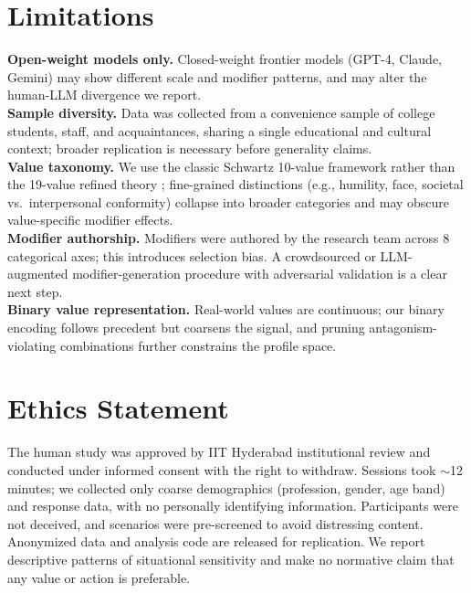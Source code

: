 \documentclass[11pt]{article}
\begin{document}
\section*{Limitations}
\label{sec:limitations}
\textbf{Open-weight models only.} Closed-weight frontier models (GPT-4, Claude, Gemini) may show different scale and modifier patterns, and may alter the human-LLM divergence we report.\\[2pt]
\textbf{Sample diversity.} Data was collected from a convenience sample of college students, staff, and acquaintances, sharing a single educational and cultural context; broader replication is necessary before generality claims.\\[2pt]
\textbf{Value taxonomy.} We use the classic Schwartz 10-value framework rather than the 19-value refined theory \citep{schwartz2012refined}; fine-grained distinctions (e.g., humility, face, societal vs.\ interpersonal conformity) collapse into broader categories and may obscure value-specific modifier effects.\\[2pt]
\textbf{Modifier authorship.} Modifiers were authored by the research team across 8 categorical axes; this introduces selection bias. A crowdsourced or LLM-augmented modifier-generation procedure with adversarial validation is a clear next step.\\[2pt]
\textbf{Binary value representation.} Real-world values are continuous; our binary encoding follows precedent \citep{sorensen2024value} but coarsens the signal, and pruning antagonism-violating combinations further constrains the profile space.

\section*{Ethics Statement}
\label{sec:ethics}

The human study was approved by IIT Hyderabad institutional review and conducted under informed consent with the right to withdraw. Sessions took $\sim$12 minutes; we collected only coarse demographics (profession, gender, age band) and response data, with no personally identifying information. Participants were not deceived, and scenarios were pre-screened to avoid distressing content. Anonymized data and analysis code are released for replication. We report descriptive patterns of situational sensitivity and make no normative claim that any value or action is preferable.

\end{document}
